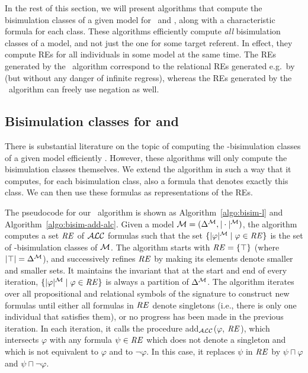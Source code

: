 In the rest of this section, we will present algorithms that compute
the bisimulation classes of a given model for \alc\ and \el, along
with a characteristic formula for each class.  These algorithms
efficiently compute \emph{all} bisimulation classes of a model, and
not just the one for some target referent.  In effect, they compute
REs for all individuals in some model at the same time.  The REs
generated by the \el\ algorithm correspond to the relational REs
generated e.g.\ by 
(but without any danger of infinite regress), whereas the REs
generated by the \alc\ algorithm can freely use negation as well.



\subsection{Bisimulation classes for \alc and \el}

There is substantial literature on the topic of computing the
\alc-bisimulation classes of a given model efficiently
\cite{hopc:algo71,paig:thre87,dovier04:_effic_algor_for_comput_bisim_equiv}.
However, these algorithms will only compute the bisimulation classes
themselves. We extend the  algorithm in such a
way that it computes, for each bisimulation class, also a formula that
denotes exactly this class.  We can then use these formulas as
representations of the REs.

The pseudocode for our \alc\ algorithm is shown as
Algorithm~\ref{algo:bisim-l} and Algorithm~\ref{algo:bisim-add-alc}.
Given a model $\mathcal{M}=(\Delta^{\mathcal{M}}, |\cdot|^{\mathcal{M}})$, the algorithm computes
a set $\mathit{RE}$ of $\mathcal{ALC}$ formulas such that the set $\{|\varphi|^{\mathcal{M}} \mid
\varphi \in \mathit{RE}\}$ is the set of \alc-bisimulation classes of $\mathcal{M}$.
The algorithm starts with $\mathit{RE} = \{\top\}$ (where $|\top| =
\Delta^{\mathcal{M}}$), and successively refines $\mathit{RE}$ by making its elements
denote smaller and smaller sets.  It maintains the invariant that at
the start and end of every iteration, $\{|\varphi|^{\mathcal{M}} \mid \varphi
\in \mathit{RE}\}$ is always a partition of $\Delta^{\mathcal{M}}$.  The algorithm
iterates over all propositional and relational symbols of the
signature to construct new formulas until either all formulas in $\mathit{RE}$
denote singletons (i.e., there is only one individual that satisfies
them), or no progress has been made in the previous iteration.  In
each iteration, it calls the procedure add$_\mathcal{ALC}$($\varphi$, $\mathit{RE}$),
which intersects $\varphi$ with any formula $\psi \in \mathit{RE}$ which does
not denote a singleton and which is not equivalent to $\varphi$ and to
$\neg \varphi$. In this case, it replaces $\psi$ in $\mathit{RE}$ by $\psi
\sqcap \varphi$ and $\psi \sqcap \neg \varphi$.


